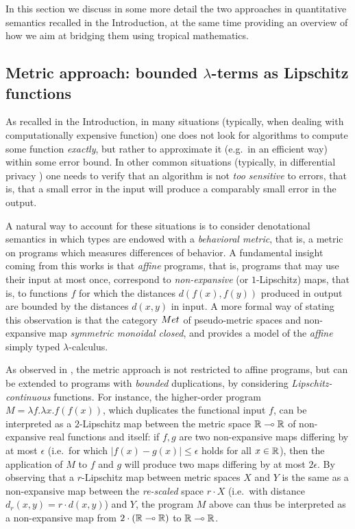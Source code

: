 

In this section we discuss in some more detail the two approaches in quantitative semantics recalled in the Introduction, at the same time providing an overview of how we aim at bridging them using tropical mathematics.

\subsection{Metric approach: bounded $\lambda$-terms as Lipschitz functions}


As recalled in the Introduction, in many situations (typically, when dealing with computationally expensive function) one does not look for algorithms to compute some function \emph{exactly}, but rather to approximate it (e.g.~in an efficient way) within some error bound. In other common situations (typically, in differential privacy \cite{}) one needs to verify that an algorithm is not \emph{too sensitive} to errors, that is, that a small error in the input will produce a comparably small error in the output. 

A natural way to account for these situations is to consider denotational semantics in which types are endowed with a \emph{behavioral metric}, that is, a metric on programs which measures differences of behavior. 
A fundamental insight coming from this works is that \emph{affine} programs, that is, programs that may use their input at most once, correspond to \emph{non-expansive} (or $1$-Lipschitz) maps, that is, to functions $f$ for which the distances
$d(f(x),f(y))$ produced in output are bounded by the distances $d(x,y)$ in input. 
A more formal way of stating this observation is that the category $\Met$ of pseudo-metric spaces and non-expansive 
map \emph{symmetric monoidal closed}, and provides a model of the \emph{affine} simply typed $\lambda$-calculus. 

As observed in \cite{Gabo2017}, the metric approach is not restricted to affine programs, but can be extended to programs with \emph{bounded} duplications, by considering \emph{Lipschitz-continuous} functions.
For instance, the higher-order program $M=\lambda f.\lambda x.f(f(x))$, which duplicates the functional input $f$, can be interpreted as a $2$-Lipschitz map between the metric space $\mathbb{R}\multimap \mathbb{R}$ of non-expansive real functions and itself: if $f,g$ are two non-expansive maps differing by at most $\epsilon$ (i.e.~for which $|f(x)-g(x)|\leq \epsilon$ holds for all $x\in \mathbb{R}$), then the application of $M$ to $f$ and $g$ will produce two maps differing by at most $2\epsilon$. 
By observing that a $r$-Lipschitz map between metric spaces $X$ and $Y$ is the same as a non-expansive map between the \emph{re-scaled} space $r\cdot X$ (i.e.~with distance $d_{r}(x,y)=r\cdot d(x,y)$) and $Y$, the program $M$ above 
can thus be interpreted as a non-expansive map from $2\cdot(\mathbb{R}\multimap \mathbb{R})$ to $\mathbb{R}\multimap \mathbb{R}$.

